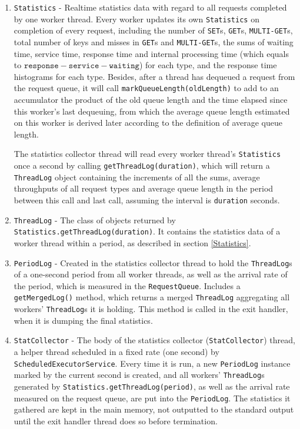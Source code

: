 \begin{enumerate}[noitemsep,topsep=0pt]
\item \label{Statistics} \texttt{Statistics} - Realtime statistics data with regard to all requests completed by one worker thread. Every worker updates its own \texttt{Statistics} on completion of every request, including the number of \texttt{SET}s, \texttt{GET}s, \texttt{MULTI-GET}s, total number of keys and misses in \texttt{GET}s and \texttt{MULTI-GET}s, the sums of waiting time, service time, response time and internal processing time (which equals to $\texttt{response} - \texttt{service} - \texttt{waiting}$) for each type, and the response time histograms for each type. Besides, after a thread has dequeued a request from the request queue, it will call \texttt{markQueueLength(oldLength)} to add to an accumulator the product of the old queue length and the time elapsed since this worker's last dequeuing, from which the average queue length estimated on this worker is derived later according to the definition of average queue length. 

The statistics collector thread will read every worker thread's \texttt{Statistics} once a second by calling \texttt{getThreadLog(duration)}, which will return a \texttt{ThreadLog} object containing the increments of all the sums, average throughputs of all request types and average queue length in the period between this call and last call, assuming the interval is \texttt{duration} seconds.


\item \texttt{ThreadLog} - The class of objects returned by \texttt{Statistics.getThreadLog(duration)}. It contains the statistics data of a worker thread within a period, as described in section \ref{Statistics}.

\item \texttt{PeriodLog} - Created in the statistics collector thread to hold the \texttt{ThreadLog}s  of a one-second period from all worker threads, as well as the arrival rate of the period, which is measured in the \texttt{RequestQueue}. Includes a \texttt{getMergedLog()} method, which returns a merged \texttt{ThreadLog} aggregating all workers' \texttt{ThreadLog}s it is holding. This method is called in the exit handler, when it is dumping the final statistics.

\item \texttt{StatCollector} - The body of the statistics collector (\texttt{StatCollector}) thread, a helper thread scheduled in a fixed rate (one second) by \texttt{ScheduledExecutorService}. Every time it is run, a new \texttt{PeriodLog} instance marked by the current second is created, and all workers' \texttt{ThreadLog}s generated by \texttt{Statistics.getThreadLog(period)}, as well as the arrival rate measured on the request queue, are put into the \texttt{PeriodLog}. The statistics it gathered are kept in the main memory, not outputted to the standard output until the exit handler thread does so before termination.


\end{enumerate}
